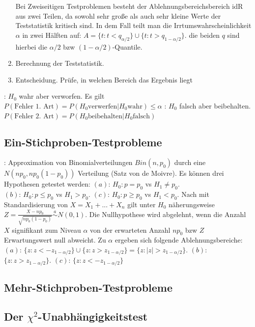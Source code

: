 \begin{enumerate}[leftmargin=*]
    Bei Zweiseitigen Testproblemen besteht der Ablehnungsbereichsbereich idR aus zwei Teilen, da sowohl sehr große als auch sehr kleine Werte der Teststatistik kritisch sind. In dem Fall teilt man die Irrtumswahrscheinlichkeit $\alpha$ in zwei Hälften auf: $A = \{t: t<q_{\alpha/2}\} \cup \{t: t>q_{1 - \alpha/2}\}$. die beiden $q$ sind hierbei die $\alpha/2$ bzw $(1 - \alpha/2)$-Quantile.
    \item Berechnung der Teststatistik. 
    \item Entscheidung. Prüfe, in welchen Bereich das Ergebnis liegt 
\end{enumerate}
: $H_0$ wahr aber verworfen. Es gilt $P(\text{Fehler 1. Art}) = P(H_0 \text{verwerfen} | H_0 \text{wahr}) \le \alpha$ : $H_0$ falsch aber beibehalten.$P(\text{Fehler 2. Art}) = P(H_0 \text{beibehalten} | H_0 \text{falsch})$ 
\subsection{Ein-Stichproben-Testprobleme}
: 
Approximation von Binomialverteilungen $Bin(n, p_0)$ durch eine $N(np_0, np_0(1-p_0))$ Verteilung (Satz von de Moivre). Es können drei Hypothesen getestet werden: $(a)$: $H_0: p = p_0$ vs $H_1 \neq p_0$.\\$(b)$: $H_0: p \le p_0$ vs $H_1 > p_0$. $(c)$: $H_0: p \ge p_0$ vs $H_1 < p_0$. Nach mit Standardisierung von $X = X_1 + ... + X_n$ gilt unter $H_0$ näherungsweise $Z = \frac{X - np_0}{\sqrt{np_0(1-p_0)}} \overset{a}{\sim}N(0, 1)$. Die Nullhypothese wird abgelehnt, wenn die Anzahl $X$ signifikant zum Niveau $\alpha$ von der erwarteten Anzahl $np_0$ bzw $Z$ Erwartungswert null abweicht. Zu $\alpha$ ergeben sich folgende Ablehnungsbereiche: $(a)$: $\{z: z < -z_{1-\alpha/2}\} \cup \{z: z>z_{1-\alpha/2}\} = \{z: |z| > z_{1-\alpha/2}\}$. $(b)$: $\{z: z > z_{1-\alpha/2}\}$. $(c)$: $\{z: z < -z_{1-\alpha/2}\}$
\newpage
\subsection{Mehr-Stichproben-Testprobleme}
\subsection{Der $\chi^2$-Unabhängigkeitstest}